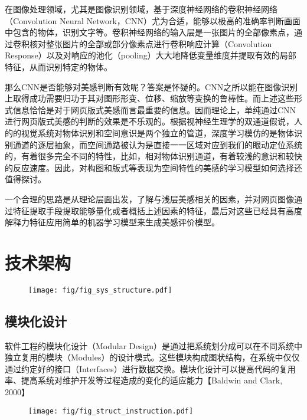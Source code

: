 在图像处理领域，尤其是图像识别领域，基于深度神经网络的卷积神经网络（Convolution Neural Network，CNN）尤为合适，能够以极高的准确率判断画面中包含的物体，识别文字等。卷积神经网络的输入层是一张图片的全部像素点，通过卷积核对整张图片的全部或部分像素点进行卷积响应计算（Convolution Response）以及对响应的池化（pooling）大大地降低变量维度并提取有效的局部特征，从而识别特定的物体。

那么CNN是否能够对美感判断有效呢？答案是怀疑的。CNN之所以能在图像识别上取得成功需要归功于其对图形形变、位移、缩放等变换的鲁棒性。而上述这些形式信息恰恰是对于网页版式美感而言最重要的信息。因而理论上，单纯通过CNN进行网页版式美感的判断的效果是不乐观的。根据视神经生理学的双通道假说，人的的视觉系统对物体识别和空间意识是两个独立的管道，深度学习模仿的是物体识别通道的逐层抽象，而空间通路被认为是直接一一区域对应到我们的眼动定位系统的，有着很多完全不同的特性，比如，相对物体识别通道，有着较浅的意识和较快的反应速度。因此，对构图和版式等表现为空间特性的美感的学习模型如何选择还值得探讨。

一个合理的思路是从理论层面出发，了解与浅层美感相关的因素，并对网页图像通过特征提取手段提取能够量化或者概括上述因素的特征，最后对这些已经具有高度解释力特征应用简单的机器学习模型来生成美感评价模型。

\section{技术架构}
\begin{figure}[H]
  \texttt{[image: fig/fig\_sys\_structure.pdf]}
\end{figure}
\subsection{模块化设计}

软件工程的模块化设计（Modular Design）是通过把系统划分成可以在不同系统中独立复用的模块（Modules）的设计模式。这些模块构成图状结构，在系统中仅仅通过约定好的接口（Interfaces）进行数据交换。模块化设计可以提高代码的复用率、提高系统对维护开发等过程造成的变化的适应能力【Baldwin and Clark, 2000】

\begin{figure}[H]
  \center
  \texttt{[image: fig/fig\_struct\_instruction.pdf]}
\end{figure}

